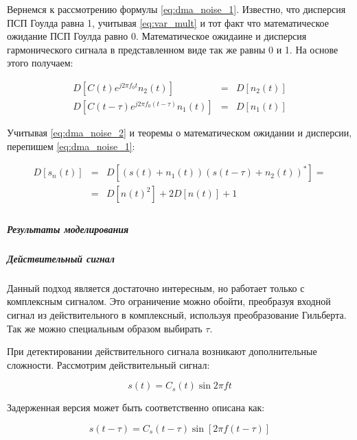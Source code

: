 Вернемся к рассмотрению формулы \ref{eq:dma_noise_1}. Известно, что дисперсия ПСП Гоулда равна 1, учитывая \ref{eq:var_mult}
и тот факт что математическое ожидание ПСП Гоулда равно 0. Математическое ожидаине и дисперсия гармонического сигнала в
представленном виде так же равны 0 и 1. На основе этого получаем:
\begin{center}
\begin{eqnarray}
	\label{eq:dma_noise_2}
	D[C(t)e^{j2{\pi}f_{0}t}n_{2}(t)] & = & D[n_{2}(t)] \nonumber \\
	D[C(t-\tau)e^{j2{\pi}f_{0}(t-\tau)}n_{1}(t)] & = & D[n_{1}(t)]
\end{eqnarray}
\end{center}

Учитывая \ref{eq:dma_noise_2} и теоремы о математическом ожидании и дисперсии, перепишем \ref{eq:dma_noise_1}:
\begin{center}
\begin{eqnarray}
	D[s_{n}(t)] & = & D[(s(t)+n_{1}(t))(s(t-\tau)+n_{2}(t))^{*}]=\nonumber \\
	& = & D[n(t)^{2}] + 2D[n(t)] + 1 \label{eq:dma_noise_3} \\
\end{eqnarray}
\end{center}

\subparagraph{Результаты моделирования}
\label{sssec:dma_simulate}

\subparagraph{Действительный сигнал}

Данный подход является достаточно интересным, но работает только с комплексным сигналом. Это ограничение можно
обойти, преобразуя входной сигнал из действительного в комплексный, используя преобразование Гильберта.
Так же можно специальным образом выбирать ${\tau}$.

При детектировании действительного сигнала возникают дополнительные сложности. Рассмотрим действительный сигнал:
\begin{center}
\begin{equation}
	\label{eq:dma_real1}
	s(t) = C_s(t) \sin{2\pi ft}
\end{equation}
\end{center}

Задерженная версия может быть соответственно описана как:
\begin{center}
\begin{equation}
	\label{eq:dma_real2}
	s(t - \tau) = C_s(t-\tau) \sin{[2\pi f(t-\tau)]}
\end{equation}
\end{center}

